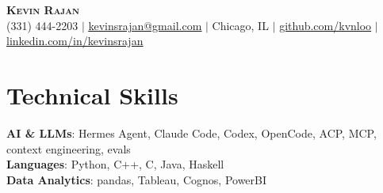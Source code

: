 \documentclass[letterpaper,11pt]{article}
\begin{document}
\begin{center}
    \textbf{\Huge \scshape Kevin Rajan} \\ \vspace{1pt}
    \small (331) 444-2203 $|$
    \href{mailto:kevinsrajan@gmail.com}{\underline{kevinsrajan@gmail.com}} $|$
    Chicago, IL $|$
    \href{https://github.com/kvnloo}{\underline{github.com/kvnloo}} $|$
    \href{https://linkedin.com/in/kevinsrajan}{\underline{linkedin.com/in/kevinsrajan}}
\end{center}

\section{Technical Skills}
 \begin{itemize}[leftmargin=0.15in, label={}]
    \small{\item{
     \textbf{AI \& LLMs}{: Hermes Agent, Claude Code, Codex, OpenCode, ACP, MCP, context engineering, evals} \\
     \textbf{Languages}{: Python, C++, C, Java, Haskell} \\
     \textbf{Data Analytics}{: pandas, Tableau, Cognos, PowerBI}
    }}
 \end{itemize}
\end{document}
